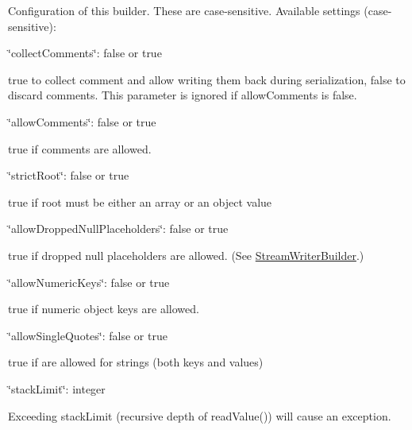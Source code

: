 Configuration of this builder. These are case-\/sensitive. Available settings (case-\/sensitive)\+:
\begin{DoxyItemize}
\item {\ttfamily \char`\"{}collect\+Comments\char`\"{}\+: false or true}
\begin{DoxyItemize}
\item true to collect comment and allow writing them back during serialization, false to discard comments. This parameter is ignored if allow\+Comments is false.
\end{DoxyItemize}
\item {\ttfamily \char`\"{}allow\+Comments\char`\"{}\+: false or true}
\begin{DoxyItemize}
\item true if comments are allowed.
\end{DoxyItemize}
\item {\ttfamily \char`\"{}strict\+Root\char`\"{}\+: false or true}
\begin{DoxyItemize}
\item true if root must be either an array or an object value
\end{DoxyItemize}
\item {\ttfamily \char`\"{}allow\+Dropped\+Null\+Placeholders\char`\"{}\+: false or true}
\begin{DoxyItemize}
\item true if dropped null placeholders are allowed. (See \hyperlink{class_json_1_1_stream_writer_builder}{Stream\+Writer\+Builder}.)
\end{DoxyItemize}
\item {\ttfamily \char`\"{}allow\+Numeric\+Keys\char`\"{}\+: false or true}
\begin{DoxyItemize}
\item true if numeric object keys are allowed.
\end{DoxyItemize}
\item {\ttfamily \char`\"{}allow\+Single\+Quotes\char`\"{}\+: false or true}
\begin{DoxyItemize}
\item true if \textquotesingle{}\textquotesingle{} are allowed for strings (both keys and values)
\end{DoxyItemize}
\item {\ttfamily \char`\"{}stack\+Limit\char`\"{}\+: integer}
\begin{DoxyItemize}
\item Exceeding stack\+Limit (recursive depth of {\ttfamily read\+Value()}) will cause an exception.

\end{DoxyItemize}
\end{DoxyItemize}
